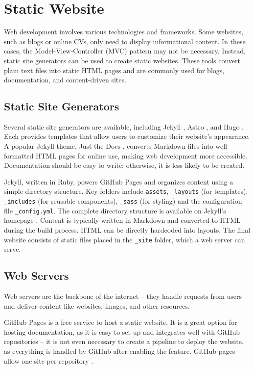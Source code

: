 \section{Static Website}
Web development involves various technologies and frameworks. Some websites, such as blogs or online CVs, only need to display informational content. In these cases, the Model-View-Controller (MVC) pattern may not be necessary. Instead, static site generators can be used to create static websites. These tools convert plain text files into static HTML pages and are commonly used for blogs, documentation, and content-driven sites.

\subsection{Static Site Generators}
Several static site generators are available, including Jekyll \cite{jekyll}, Astro \parencite{astro}, and Hugo \cite{hugo}. Each provides templates that allow users to customize their website's appearance. A popular Jekyll theme, Just the Docs \cite{just-the-docs}, converts Markdown files into well-formatted HTML pages for online use, making web development more accessible. Documentation should be easy to write; otherwise, it is less likely to be created.

Jekyll, written in Ruby, powers GitHub Pages \cite{GitHubPagesJekyll} and organizes content using a simple directory structure. Key folders include \texttt{assets}, \texttt{\_layouts} (for templates), \texttt{\_includes} (for reusable components), \texttt{\_sass} (for styling) and the configuration file \texttt{\_config.yml}. The complete directory structure is available on Jekyll's homepage \cite{jekyll}. Content is typically written in Markdown and converted to HTML during the build process. HTML can be directly hardcoded into layouts. The final website consists of static files placed in the \texttt{\_site} folder, which a web server can serve.

\subsection{Web Servers}
Web servers are the backbone of the internet -- they handle requests from users and deliver content like websites, images, and other resources. 

GitHub Pages is a free service to host a static website. It is a great option for hosting documentation, as it is easy to set up and integrates well with GitHub repositories -- it is not even necessary to create a pipeline to deploy the website, as everything is handled by GitHub after enabling the feature. GitHub pages allow one site per repository \cite{GitHubPagesLimits}.


